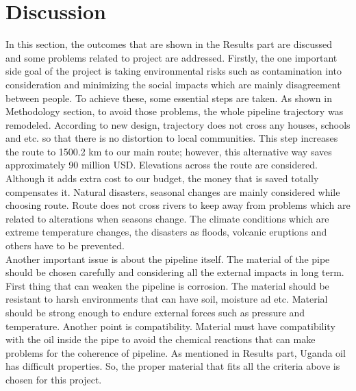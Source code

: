 \documentclass[12pt]{article}
\begin{document}
\section*{Discussion}
{\fontsize{12pt}{12pt}\selectfont
\hspace*{1em}In this section, the outcomes that are shown in the Results part are discussed and some problems related to project are addressed. Firstly, the one important side goal of the project is taking environmental risks such as contamination into consideration and minimizing the social impacts which are mainly disagreement between people. To achieve these, some essential steps are taken. As shown in Methodology section, to avoid those problems, the whole pipeline trajectory was remodeled. According to new design, trajectory does not cross any houses, schools and etc. so that there is no distortion to local communities. This step increases the route to 1500.2 km to our main route; however, this alternative way saves approximately 90 million USD. Elevations across the route are considered. Although it adds extra cost to our budget, the money that is saved totally compensates it. Natural disasters, seasonal changes are mainly considered while choosing route. Route does not cross rivers to keep away from problems which are related to alterations when seasons change. The climate conditions which are extreme temperature changes, the disasters as floods, volcanic eruptions and others have to be prevented.
\\

Another important issue is about the pipeline itself. The material of the pipe should be chosen carefully and considering all the external impacts in long term. First thing that can weaken the pipeline is corrosion. The material should be resistant to harsh environments that can have soil, moisture ad etc. Material should be strong enough to endure external forces such as pressure and temperature. Another point is compatibility. Material must have compatibility with the oil inside the pipe to avoid the chemical reactions that can make problems for the coherence of pipeline. As mentioned in Results part, Uganda oil has difficult properties. So, the proper material that fits all the criteria above is chosen for this project.
\\

}
\end{document}

